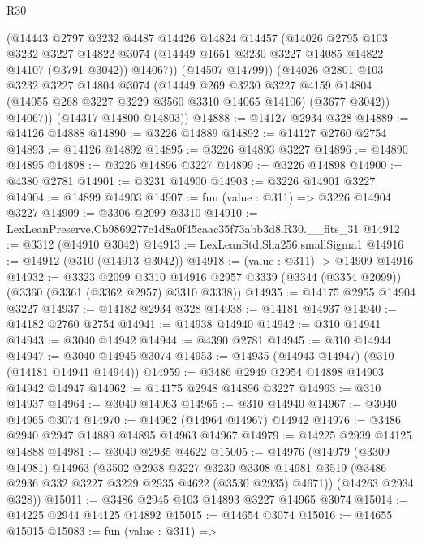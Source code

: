\begin{lexlean}{R30}
\begin{coremodule}
          (@14443
            @2797
            @3232
            @4487
            @14426
            @14824
            @14457
            (@14026
              @2795
              @103
              @3232
              @3227
              @14822
              @3074
              (@14449 @1651 @3230 @3227 @14085 @14822 @14107 (@3791 @3042))
              @14067))
          (@14507 @14799))
        (@14026
          @2801
          @103
          @3232
          @3227
          @14804
          @3074
          (@14449
            @269
            @3230
            @3227
            @4159
            @14804
            (@14055 @268 @3227 @3229 @3560 @3310 @14065 @14106)
            (@3677 @3042))
          @14067))
      (@14317 @14800 @14803))
@14888 := @14127 @2934 @328
@14889 := @14126 @14888
@14890 := @3226 @14889
@14892 := @14127 @2760 @2754
@14893 := @14126 @14892
@14895 := @3226 @14893 @3227
@14896 := @14890 @14895
@14898 := @3226 @14896 @3227
@14899 := @3226 @14898
@14900 := @4380 @2781
@14901 := @3231 @14900
@14903 := @3226 @14901 @3227
@14904 := @14899 @14903
@14907 := fun (value : @311) => @3226 @14904 @3227
@14909 := @3306 @2099 @3310
@14910 := LexLeanPreserve.Cb9869277c1d8a0f45caac35f73abb3d8.R30.__fits_31
@14912 := @3312 (@14910 @3042)
@14913 := LexLeanStd.Sha256.smallSigma1
@14916 := @14912 (@310 (@14913 @3042))
@14918 := (value : @311) -> @14909 @14916
@14932 := @3323
    @2099
    @3310
    @14916
    @2957
    @3339
    (@3344 (@3354 @2099))
    (@3360 (@3361 (@3362 @2957) @3310 @3338))
@14935 := @14175 @2955 @14904 @3227
@14937 := @14182 @2934 @328
@14938 := @14181 @14937
@14940 := @14182 @2760 @2754
@14941 := @14938 @14940
@14942 := @310 @14941
@14943 := @3040 @14942
@14944 := @4390 @2781
@14945 := @310 @14944
@14947 := @3040 @14945 @3074
@14953 := @14935 (@14943 @14947) (@310 (@14181 @14941 @14944))
@14959 := @3486 @2949 @2954 @14898 @14903 @14942 @14947
@14962 := @14175 @2948 @14896 @3227
@14963 := @310 @14937
@14964 := @3040 @14963
@14965 := @310 @14940
@14967 := @3040 @14965 @3074
@14970 := @14962 (@14964 @14967) @14942
@14976 := @3486 @2940 @2947 @14889 @14895 @14963 @14967
@14979 := @14225 @2939 @14125 @14888
@14981 := @3040 @2935 @4622
@15005 := @14976
    (@14979
      (@3309 @14981)
      @14963
      (@3502
        @2938
        @3227
        @3230
        @3308
        @14981
        @3519
        (@3486 @2936 @332 @3227 @3229 @2935 @4622 (@3530 @2935) @4671))
      (@14263 @2934 @328))
@15011 := @3486 @2945 @103 @14893 @3227 @14965 @3074
@15014 := @14225 @2944 @14125 @14892
@15015 := @14654 @3074
@15016 := @14655 @15015
@15083 := fun (value : @311) =>

\end{coremodule}
\end{lexlean}
